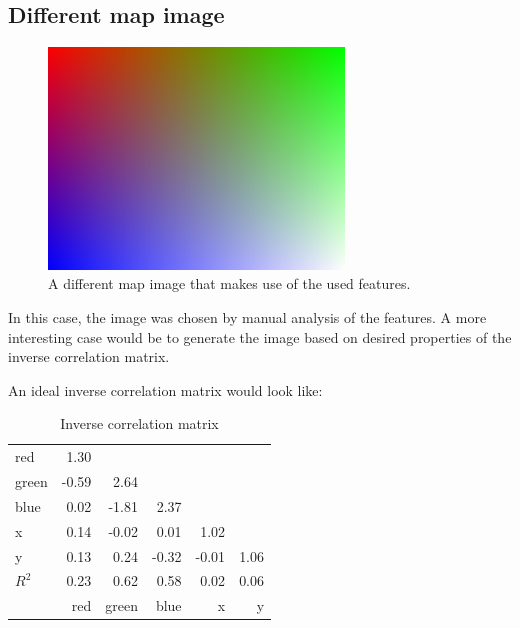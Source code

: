 \documentclass{article}
\begin{document}
\subsection{Different map image}

\begin{figure}[h]
  \centering
  \includegraphics[width=0.7\textwidth]{gradient}
  \caption{A different map image that makes use of the used features.}
  \label{fig:newmap}
\end{figure}

In this case, the image was chosen by manual analysis of the
features. A more interesting case would be to generate the image based
on desired properties of the inverse correlation matrix. 

An ideal inverse correlation matrix would look like:

\begin{table}                                   
\centering                                      
\begin{tabular}{l|rrrrr}                    
    red   & 1.30  &       &       &       &      \\  
    green & -0.59 & 2.64  &       &       &      \\
    blue  & 0.02  & -1.81 & 2.37  &       &      \\ 
    x     & 0.14  & -0.02 & 0.01  & 1.02  &      \\ 
    y     & 0.13  & 0.24  & -0.32 & -0.01 & 1.06 \\ 
  \midrule
  $R^2$   & 0.23  & 0.62  & 0.58  & 0.02  & 0.06 \\
  \midrule
          & red   & green & blue  & x     & y
\end{tabular}                                   
\caption{Inverse correlation matrix}                        
\label{table:MyTableLabel}                      
\end{table} 
\end{document}
